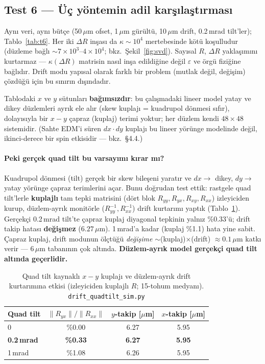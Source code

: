 \documentclass[twocolumn,a4paper,10pt]{article}
\begin{document}
\subsection{Test 6 --- Üç yöntemin adil karşılaştırması}
Aynı veri, aynı bütçe (50\,$\mu$m ofset, 1\,$\mu$m gürültü, 10\,$\mu$m drift,
0.2\,mrad tilt'ler); Tablo~\ref{tab:t6}. Her iki $\Delta R$ inşası da
$\kappa\sim 10^4$ mertebesinde kötü koşulludur (düzleme bağlı
$\sim 7\times10^3$--$4\times10^4$; bkz.\ Şekil~\ref{fig:svd}). Sayısal $R$,
$\Delta R$ yaklaşımını kurtarmaz --- $\kappa(\Delta R)$ matrisin nasıl inşa
edildiğine değil $\varepsilon$ ve örgü fiziğine bağlıdır. Drift modu yapısal
olarak farklı bir problem (mutlak değil, değişim) çözdüğü için bu sınırın
dışındadır.

Tablodaki $x$ ve $y$ sütunları \textbf{bağımsızdır}: bu çalışmadaki lineer model
yatay ve dikey düzlemleri ayrık ele alır (skew kuplajı = kuadrupol dönmesi
sıfır), dolayısıyla bir $x\!-\!y$ çapraz (kuplaj) terimi yoktur; her düzlem kendi
$48\times48$ sistemidir. (Sahte EDM'i süren $dx\cdot dy$ kuplajı bu lineer
yörünge modelinde değil, ikinci-derece bir spin etkisidir --- bkz.\ \S4.4.)

\paragraph{Peki gerçek quad tilt bu varsayımı kırar mı?} Kuadrupol dönmesi
(tilt) gerçek bir skew bileşeni yaratır ve $dx\to$ dikey, $dy\to$ yatay yörünge
çapraz terimlerini açar. Bunu doğrudan test ettik: rastgele quad tilt'lerle
\textbf{kuplajlı} tam tepki matrisini (dört blok $R_{yy},R_{yx},R_{xy},R_{xx}$)
izleyiciden kurup, düzlem-ayrık monitörle ($R_{yy}^{-1},R_{xx}^{-1}$) drift
kurtarımı yaptık (Tablo~\ref{tab:tilt}). Gerçekçi 0.2\,mrad tilt'te çapraz kuplaj
diyagonal tepkinin yalnız \%0.33'ü; drift takip hatası \textbf{değişmez}
($6.27\,\mu$m). 1\,mrad'a kadar (kuplaj \%1.1) hata yine sabit. Çapraz kuplaj,
drift modunun ölçtüğü \emph{değişime} $\sim$(kuplaj)$\times$(drift)
$\approx 0.1\,\mu$m katkı verir --- 6\,$\mu$m tabanının çok altında.
\textbf{Düzlem-ayrık model gerçekçi quad tilt altında geçerlidir.}

\begin{table}[tb]
\centering\small
\caption{Quad tilt kaynaklı $x\!-\!y$ kuplajı ve düzlem-ayrık drift kurtarımına
etkisi (izleyiciden kuplajlı $R$; 15-tohum medyanı).
\texttt{drift\_quadtilt\_sim.py}}
\label{tab:tilt}
\begin{tabular}{@{}lccc@{}}
\toprule
Quad tilt & $\|R_{yx}\|/\|R_{xx}\|$ & $y$-takip [$\mu$m] & $x$-takip [$\mu$m] \\
\midrule
0          & \%0.00 & 6.27 & 5.95 \\
\textbf{0.2\,mrad} & \textbf{\%0.33} & \textbf{6.27} & \textbf{5.95} \\
1\,mrad    & \%1.08 & 6.26 & 5.95 \\
\bottomrule
\end{tabular}
\end{table}
\end{document}
